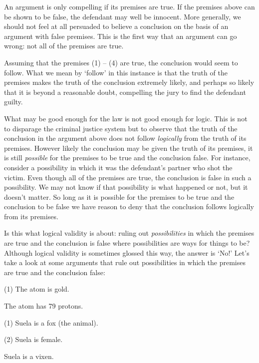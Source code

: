 An argument is only compelling if its premises are true.
If the premises above can be shown to be false, the defendant may well be innocent.
More generally, we should not feel at all persuaded to believe a conclusion on the basis of an argument with false premises. 
This is the first way that an argument can go wrong: not all of the premises are true.

Assuming that the premises (1) -- (4) are true, the conclusion would seem to follow.
What we mean by `follow' in this instance is that the truth of the premises makes the truth of the conclusion extremely likely, and perhaps so likely that it is beyond a reasonable doubt, compelling the jury to find the defendant guilty.

What may be good enough for the law is not good enough for logic.
This is not to disparage the criminal justice system but to observe that the truth of the conclusion in the argument above does not follow \textit{logically} from the truth of its premises.
However likely the conclusion may be given the truth of its premises, it is still \textit{possible} for the premises to be true and the conclusion false.
For instance, consider a possibility in which it was the defendant's partner who shot the victim.
Even though all of the premises are true, the conclusion is false in such a possibility.
We may not know if that possibility is what happened or not, but it doesn't matter.
So long as it is possible for the premises to be true and the conclusion to be false we have reason to deny that the conclusion follows logically from its premises.

Is this what logical validity is about: ruling out \textit{possibilities} in which the premises are true and the conclusion is false where possibilities are ways for things to be?
Although logical validity is sometimes glossed this way, the answer is `No!'
Let's take a look at some arguments that rule out possibilities in which the premises are true and the conclusion false:

\begin{earg}
  \item[(1)] The atom is gold.
  \item[\therefore] The atom has 79 protons.
\end{earg}


\begin{earg}
  \item[(1)] Suela is a fox (the animal).
  \item[(2)] Suela is female.
  \item[\therefore] Suela is a vixen.
\end{earg}

